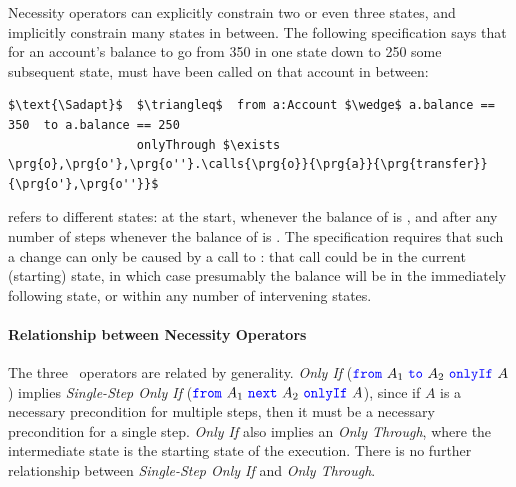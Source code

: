 \label{sec:adapt:motivate}
\noindent Necessity operators can explicitly constrain two or even three states,
and implicitly constrain many states in between. The following 
 specification  \Sadapt 
 says that for an account's balance to go  
 from 350 in one state down to 250 some subsequent state, 
  must have been called on that account in between:
%
\begin{lstlisting}[language = Chainmail, mathescape=true, frame=lines]
$\text{\Sadapt}$  $\triangleq$  from a:Account $\wedge$ a.balance == 350  to a.balance == 250
                  onlyThrough $\exists \prg{o},\prg{o'},\prg{o''}.\calls{\prg{o}}{\prg{a}}{\prg{transfer}}{\prg{o'},\prg{o''}}$
\end{lstlisting}
%
\Sadapt  refers to  different states: at 
the start,  whenever the balance of  is , and after any number of steps
whenever the balance of  is . The specification requires
that such a change can only be caused by a call to  :
that call could be in the current (starting) state,
  in which case
 presumably the balance will be  in the immediately following state,
or within any number of intervening states.



\paragraph{Relationship between Necessity Operators}
The three \Nec \ operators
are related by generality. 
 \emph{Only If} (${\color{blue}\texttt{from}}\ A_1\ {\color{blue}\texttt{to}}\ A_2\ {\color{blue}\texttt{onlyIf}}\ A$) implies
  \emph{Single-Step Only If} (${\color{blue}\texttt{from}}\ A_1\ {\color{blue}\texttt{next}}\ A_2\ {\color{blue}\texttt{onlyIf}}\ A$), since if $A$ is 
a necessary precondition for multiple steps, then it must be a necessary 
precondition for a single step. 
 \emph{Only If} also implies 
an \emph{Only Through}, where the intermediate state is the starting state
of the execution.  There is no further relationship between 
\emph{Single-Step Only If} and \emph{Only Through}.


